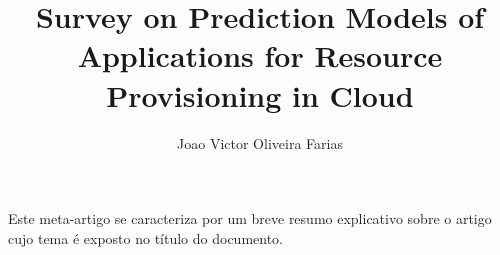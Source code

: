 \documentclass[12pt]{article}
\title{Survey on Prediction Models of Applications for Resource Provisioning in Cloud}
\author{Joao Victor Oliveira Farias}
\begin{document}
 

\maketitle

\begin{abstract}
  
\end{abstract}
     
\begin{resumo} 
  Este meta-artigo se caracteriza por um breve resumo explicativo sobre o artigo cujo tema é exposto no título do documento.
\end{resumo}




\end{document}
